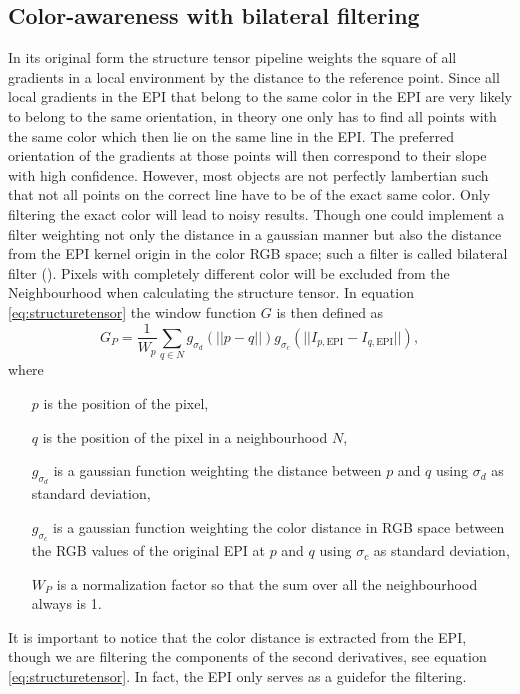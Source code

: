 \documentclass  [
  paper    = a4,
  BCOR     = 10mm,
  twoside,
  fontsize = 12pt,
  fleqn,
  toc      = bibnumbered,
  toc      = listofnumbered,
  numbers  = noendperiod,
  headings = normal,
  listof   = leveldown,
  version  = 3.03
]                                       {scrreprt}
\begin{document}
 \subsection{Color-awareness with bilateral filtering}
 \label{sec:bilateral}
 In its original form the structure tensor pipeline weights the square of all gradients in a local environment by the distance to the reference point. Since all local gradients in the EPI that belong to the same color in the EPI are very likely to belong to the same orientation, in theory one only has to find all points with the same color which then lie on the same line in the EPI. The preferred orientation of the gradients at those points will then correspond to their slope with high confidence. However, most objects are not perfectly lambertian such that not all points on the correct line have to be of the exact same color. Only filtering the exact color will lead to noisy results. Though one could implement a filter weighting not only the distance in a gaussian manner but also the distance from the  EPI kernel origin in the color RGB space; such a filter is called \glqq bilateral filter \grqq (\cite{tomasi1998bilateral}). Pixels with completely different color will be excluded from the Neighbourhood when calculating the structure tensor. In equation \ref{eq:structuretensor} the window function $G$ is then defined as 
 \begin{equation}\label{key}
 G_P = \frac{1}{W_p}\sum_{q\in N} g_{\sigma_d}(||p-q||) g_{\sigma_c}(||I_{p, \text{EPI}}-I_{q, \text{EPI}}||),
 \end{equation}
 where
 \begin{itemize}
 	\item[$p$] is the position of the pixel,
 	\item[$q$] is the position of the pixel in a neighbourhood $N$,
 	\item[ $g_{\sigma_d}$] is a gaussian function weighting the distance between $p$ and $q$ using $\sigma_d$ as standard deviation,
 	\item[ $g_{\sigma_c}$] is a gaussian function weighting the color distance in RGB space between the  RGB values of the original EPI at $p$ and $q$ using $\sigma_c$ as standard deviation,
 	\item[$W_P$] is a normalization factor so that the sum over all the neighbourhood always is 1. 
 \end{itemize}
It is important to notice that the color distance is extracted from the EPI, though we are filtering the components of the second derivatives, see equation \ref{eq:structuretensor}. In fact, the EPI only serves as a \glqq guide\grqq for the filtering.
\end{document}
